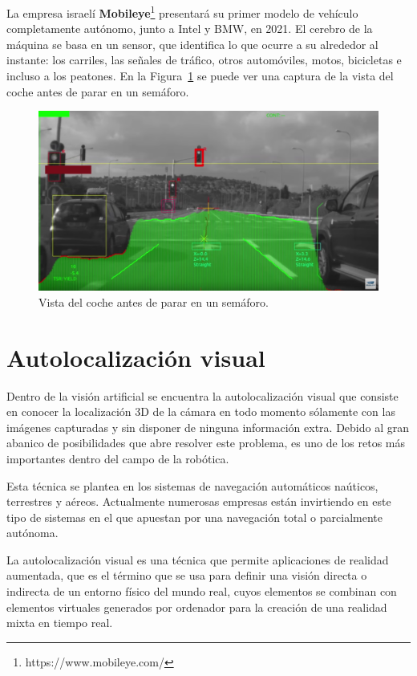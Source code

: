 La empresa israelí \textbf{Mobileye}\footnote{https://www.mobileye.com/} presentará su primer modelo de vehículo completamente autónomo, junto a Intel y BMW, en 2021. El cerebro de la máquina se basa en un sensor, que identifica lo que ocurre a su alrededor al instante: los carriles, las señales de tráfico, otros automóviles, motos, bicicletas e incluso a los peatones. En la Figura~\ref{fig:Car} se puede ver una captura de la vista del coche antes de parar en un semáforo.

\begin{figure}[th]
\centering
\includegraphics[scale=0.3]{Figures/car.png}
\decoRule
\caption[Visión para la autoconducción]{Vista del coche antes de parar en un semáforo.}
\label{fig:Car}
\end{figure}


\section{Autolocalización visual}
Dentro de la visión artificial se encuentra la autolocalización visual que consiste en conocer la localización 3D de la cámara en todo momento sólamente con las imágenes capturadas y sin disponer de ninguna información extra. Debido al gran abanico de posibilidades que abre resolver este problema, es uno de los retos más importantes dentro del campo de la robótica.

Esta técnica se plantea en los sistemas de navegación automáticos naúticos, terrestres y aéreos. Actualmente numerosas empresas están invirtiendo en este tipo de sistemas en el que apuestan por una navegación total o parcialmente autónoma.

La autolocalización visual es una técnica que permite aplicaciones de realidad aumentada, que es el término que se usa para definir una visión directa o indirecta de un entorno físico del mundo real, cuyos elementos se combinan con elementos virtuales generados por ordenador para la creación de una realidad mixta en tiempo real.

